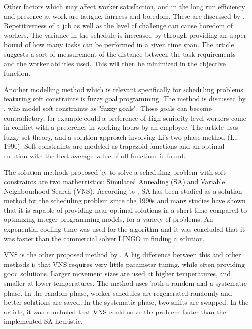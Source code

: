 Other factors which may affect worker satisfaction, and in the long run efficiency and presence at work are fatigue, fairness and boredom. These are discussed by  \citet{eiselt_2008}. Repetitiveness of a job as well as the level of challenge can cause boredom of workers. The variance in the schedule is increased by \citet{eiselt_2008} through providing an upper bound of how many tasks can be performed in a given time span. The article suggests a sort of measurement of the distance between the task requirements and the worker abilities used. This will then be minimized in the objective function.

Another modelling method which is relevant specifically for scheduling problems featuring soft constraints is fuzzy goal programming. The method is discussed by \citet{shahnazari_2013}, who model soft constraints as "fuzzy goals". These goals can become contradictory, for example could a preference of high seniority level workers come in conflict with a preference in working hours by an employee. The article uses fuzzy set theory, and a solution approach involving Li's two-phase method (Li, 1990). Soft constraints are modeled as trapezoid functions and an optimal solution with the best average value of all functions is found.

The solution methods proposed by \citet{akbari_2013} to solve a scheduling problem with soft constraints are two matheuristics: Simulated Annealing (SA) and Variable Neighbourhood Search (VNS). According to \citet{akbari_2013}, SA has been studied as a solution method for the scheduling problem since the 1990s and many studies have shown that it is capable of providing near-optimal solutions in a short time compared to optimizing integer programming models, for a variety of problems. An exponential cooling time was used for the algorithm and it was concluded that it was faster than the commercial solver LINGO in finding a solution.

VNS is the other proposed method by \citet{akbari_2013}. A big difference between this and other methods is that VNS requires very little parameter tuning, while often providing good solutions.
Larger movement sizes are used at higher temperatures, and smaller at lower temperatures. The method uses both a random and a systematic phase. In the random phase, worker schedules are regenerated randomly and better solutions are saved. In the systematic phase, two shifts are swapped. In the article, it was concluded that VNS could solve the problem faster than the implemented SA heuristic.

